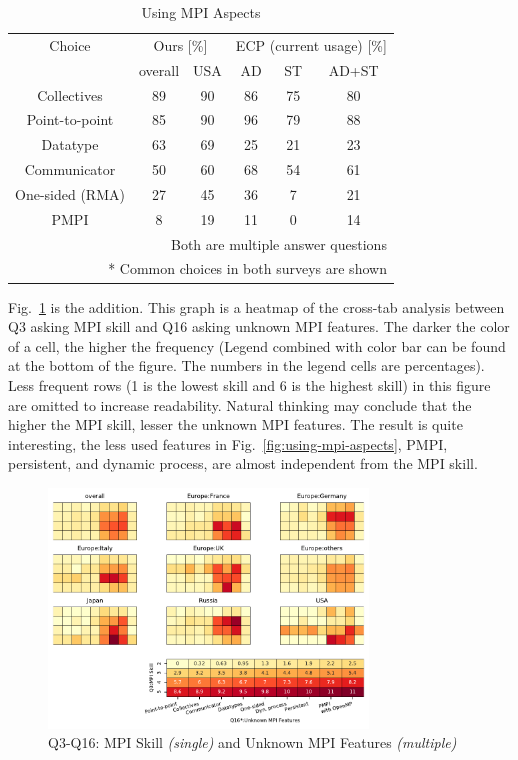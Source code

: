 \documentclass[preprint,5p,times]{elsarticle}
\begin{document}
\begin{table}[htb]%
  \begin{center}%
    \caption{Using MPI Aspects}\label{tab:using-mpi-aspects}%
    \begin{tabular}{c||c|c||c|c|c}%
      \hline%
      Choice & \multicolumn{2}{c||}{Ours [\%]} &
      \multicolumn{3}{c}{ECP {\scriptsize (current usage)} [\%]} \\
      \cline{2-6}%
      & overall & USA & AD & ST & {\small AD+ST} \\
      \hline%
      Collectives & 89 & 90 & 86 & 75 & 80 \\
      Point-to-point & 85 & 90 & 96 & 79 & 88 \\
      Datatype & 63 & 69 & 25 & 21 & 23 \\
      Communicator & 50 & 60 & 68 & 54 & 61 \\
      {\small One-sided (RMA)} & 27 & 45 & 36 & 7 & 21 \\
      PMPI & 8 & 19 & 11 & 0 & 14 \\
      \hline%
      \multicolumn{6}{r}{\small * Both are multiple answer questions} \\
      \multicolumn{6}{r}{\small ** Common choices in both surveys are shown}\\
    \end{tabular}%
  \end{center}%
\end{table}%

Fig.~\ref{fig:skill-and-aspects} is the addition. This graph is a
heatmap of the cross-tab analysis between Q3 asking MPI skill and Q16
asking unknown MPI features. The darker the color of a cell, the
higher the frequency (Legend combined with color bar can be found at
the bottom of the figure. The numbers in the legend cells are
percentages). Less frequent rows (1 is the lowest skill and 6 is the
highest skill) in this figure are
omitted to increase readability. Natural thinking may conclude
that the higher the MPI skill, lesser the unknown MPI features. The
result is quite interesting, the less used features in
Fig.~\ref{fig:using-mpi-aspects}, PMPI, persistent, and dynamic
process, are almost independent from the MPI skill.

\begin{figure}[htb]
  \begin{center}
    \includegraphics[width=8.5cm]{Figs/Q3-Q16.pdf}
    \caption{Q3-Q16: MPI Skill {\it(single)} and Unknown MPI Features {\it(multiple)}}
    \label{fig:skill-and-aspects}
  \end{center}
\end{figure}
\end{document}
